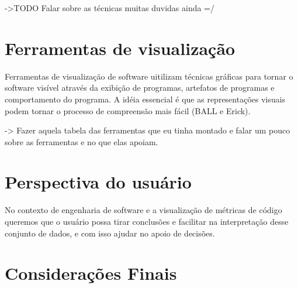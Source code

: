 ->TODO Falar sobre as técnicas muitas duvidas ainda =/

\section{Ferramentas de visualização}

Ferramentas de visualização de software uitilizam técnicas gráficas para tornar
o software visível através da exibição de programas, artefatos de programas e
comportamento do programa. A idéia essencial é que as representações visuais
podem tornar o processo de compreensão mais fácil (BALL e Erick).

-> Fazer aquela tabela das ferramentas que eu tinha montado e falar um pouco sobre
as ferramentas e no que elas apoiam.


\section{Perspectiva do usuário}

No contexto de engenharia de software e a visualização de métricas de código
queremos que o usuário possa tirar conclusões e facilitar na interpretação desse
 conjunto de dados, e com isso ajudar no apoio de decisões.

\section{Considerações Finais}
%
